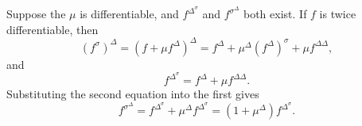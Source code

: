 \documentclass[nonumber]{homework}
\begin{document}
	Suppose the $\mu$ is differentiable, and $f^{\Delta^\sigma}$ and $f^{\sigma^\Delta}$ both exist. If $f$ is twice differentiable, then
	\begin{equation*}
		(f^\sigma)^\Delta = (f + \mu f^\Delta)^\Delta = f^\Delta + \mu^\Delta (f^\Delta)^\sigma + \mu f^{\Delta\Delta},
	\end{equation*}
	and
	\begin{equation*}
		f^{\Delta^\sigma} = f^\Delta + \mu f^{\Delta\Delta}.
	\end{equation*}
	Substituting the second equation into the first gives
	\begin{equation*}
		f^{\sigma^\Delta} = f^{\Delta^\sigma} + \mu^\Delta f^{\Delta^\sigma} = (1+\mu^\Delta)f^{\Delta^\sigma}.
	\end{equation*}
\end{document}
